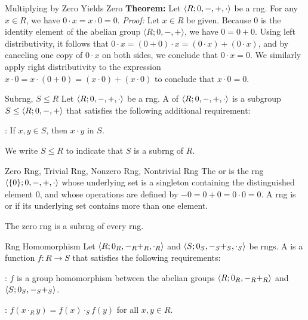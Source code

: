 \begin{thmbox}{Multiplying by Zero Yields Zero}
	\textbf{Theorem:} Let ${\langle {R; 0, -, +, \cdot} \rangle}$ be a rng. For any $x \in R$, we have $0 \cdot x = x \cdot 0 = 0$.
\tcblower
	\textit{Proof:} Let $x \in R$ be given. Because $0$ is the identity element of the abelian group $\langle R; 0, -, + \rangle$, we have $0 = 0 + 0$. Using left distributivity, it follows that $0 \cdot x = (0 + 0) \cdot x = (0 \cdot x) + (0 \cdot x)$, and by canceling one copy of $0 \cdot x$ on both sides, we conclude that $0 \cdot x = 0$. We similarly apply right distributivity to the expression $x \cdot 0 = x \cdot (0 + 0) = (x \cdot 0) + (x \cdot 0)$ to conclude that $x \cdot 0 = 0$.
\end{thmbox}

\begin{dfnbox}{Subrng, $S \le R$}
	Let ${\langle {R; 0, -, +, \cdot} \rangle}$ be a rng. A  of ${\langle {R; 0, -, +, \cdot} \rangle}$ is a subgroup $S \le {\langle {R; 0, -, +} \rangle}$ that satisfies the following additional requirement:
	\begin{dfnitems}
		\item {}: If $x, y \in S$, then $x \cdot y$ in $S$.
	\end{dfnitems}
	We write $S \le R$ to indicate that $S$ is a subrng of $R$.
\end{dfnbox}

\begin{dfnbox}{Zero Rng, Trivial Rng, Nonzero Rng, Nontrivial Rng}
	The  or  is the rng ${\langle { \{0\}; 0, -, +, \cdot } \rangle}$ whose underlying set is a singleton containing the distinguished element $0$, and whose operations are defined by $-0 = 0 + 0 = 0 \cdot 0 = 0$. A rng is  or  if its underlying set contains more than one element.
\end{dfnbox}

The zero rng is a subrng of every rng.

\begin{dfnbox}{Rng Homomorphism}
	Let ${\langle {R; 0_R, -_R +_R, \cdot_R} \rangle}$ and ${\langle {S; 0_S, -_S +_S, \cdot_S} \rangle}$ be rngs. A  is a function $f: R \to S$ that satisfies the following requirements:
	\begin{dfnitems}
		\item {}: $f$ is a group homomorphism between the abelian groups ${\langle {R; 0_R, -_R +_R} \rangle}$ and ${\langle {S; 0_S, -_S +_S} \rangle}$.
		\item {}: $f(x \cdot_R y) = f(x) \cdot_S f(y)$ for all $x, y \in R$.
	\end{dfnitems}
\end{dfnbox}

